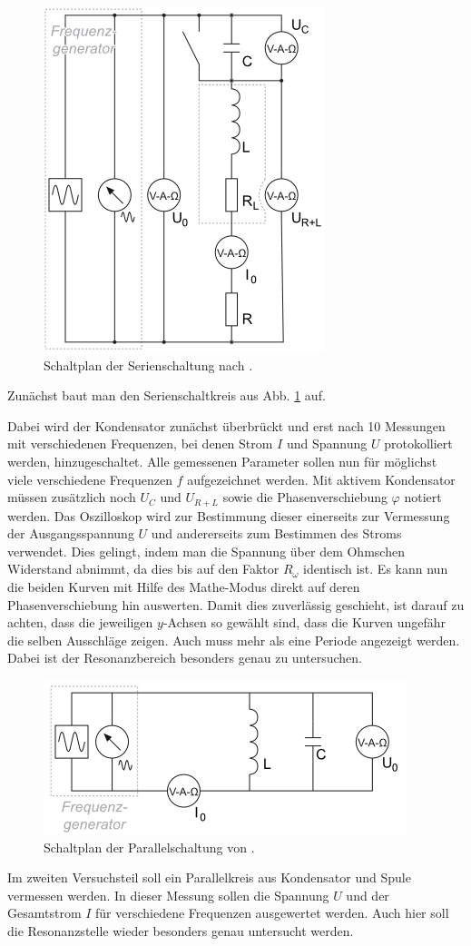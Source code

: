 \documentclass[12pt,a4paper,titlepage,headinclude,bibtotoc]{scrartcl}
\begin{document}
\begin{figure}[!h]
\centering
\includegraphics[width=0.5\linewidth]{serie}
\caption{Schaltplan der Serienschaltung nach \cite[4.10.2014, 15:30]{LP14}.}
\label{fig:serienschaltung}
\end{figure}
Zunächst baut man den Serienschaltkreis aus Abb. \ref{fig:serienschaltung} auf.

Dabei wird der Kondensator zunächst überbrückt und erst nach 10 Messungen mit verschiedenen Frequenzen, bei denen Strom $I$ und Spannung $U$ protokolliert werden, hinzugeschaltet.
Alle gemessenen Parameter sollen nun für möglichst viele verschiedene Frequenzen $f$ aufgezeichnet werden.
Mit aktivem Kondensator müssen zusätzlich noch $U_C$ und $U_{R+L}$ sowie die Phasenverschiebung $\varphi$ notiert werden.
Das Oszilloskop wird zur Bestimmung dieser einerseits zur Vermessung der Ausgangsspannung $U$ und andererseits zum Bestimmen des Stroms verwendet.
Dies gelingt, indem man die Spannung über dem Ohmschen Widerstand abnimmt, da dies bis auf den Faktor $R_\omega$ identisch ist. 
Es kann nun die beiden Kurven mit Hilfe des Mathe-Modus direkt auf deren Phasenverschiebung hin auswerten.
Damit dies zuverlässig geschieht, ist darauf zu achten, dass die jeweiligen $y$-Achsen so gewählt sind, dass die Kurven ungefähr die selben Ausschläge zeigen.
Auch muss mehr als eine Periode angezeigt werden.
Dabei ist der Resonanzbereich besonders genau zu untersuchen.\\

\begin{figure}[!h]
\centering
\includegraphics[width=0.6\linewidth]{parallel}
\caption{Schaltplan der Parallelschaltung von \cite[4.10.2014, 15:30]{LP14}.}
\label{fig:parallel}
\end{figure}
Im zweiten Versuchsteil soll ein Parallelkreis aus Kondensator und Spule vermessen werden.
In dieser Messung sollen die Spannung $U$ und der Gesamtstrom $I$ für verschiedene Frequenzen ausgewertet werden.
Auch hier soll die Resonanzstelle wieder besonders genau untersucht werden.\\
\end{document}
